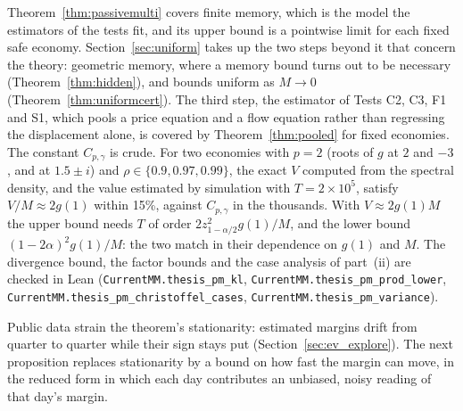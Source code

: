\begin{remark}\label{rem:passivecert}
Theorem~\ref{thm:passivemulti} covers finite memory, which is the model the estimators of the tests fit, and its upper bound is a pointwise limit for each fixed safe economy. Section~\ref{sec:uniform} takes up the two steps beyond it that concern the theory: geometric memory, where a memory bound turns out to be necessary (Theorem~\ref{thm:hidden}), and bounds uniform as $M\to0$ (Theorem~\ref{thm:uniformcert}). The third step, the estimator of Tests C2, C3, F1 and S1, which pools a price equation and a flow equation rather than regressing the displacement alone, is covered by Theorem~\ref{thm:pooled} for fixed economies. The constant $C_{p,\gamma}$ is crude. For two economies with $p=2$ (roots of $g$ at $2$ and $-3$, and at $1.5\pm i$) and $\rho\in\{0.9,0.97,0.99\}$, the exact $V$ computed from the spectral density, and the value estimated by simulation with $T=2\times10^5$, satisfy $V/M\approx2g(1)$ within 15\%, against $C_{p,\gamma}$ in the thousands. With $V\approx2g(1)M$ the upper bound needs $T$ of order $2z_{1-\alpha/2}^2g(1)/M$, and the lower bound $(1-2\alpha)^2g(1)/M$: the two match in their dependence on $g(1)$ and $M$. The divergence bound, the factor bounds and the case analysis of part~(ii) are checked in Lean (\nolinkurl{CurrentMM.thesis_pm_kl}, \nolinkurl{CurrentMM.thesis_pm_prod_lower}, \nolinkurl{CurrentMM.thesis_pm_christoffel_cases}, \nolinkurl{CurrentMM.thesis_pm_variance}).
\end{remark}

Public data strain the theorem's stationarity: estimated margins drift from quarter to quarter while their sign stays put (Section~\ref{sec:ev_explore}). The next proposition replaces stationarity by a bound on how fast the margin can move, in the reduced form in which each day contributes an unbiased, noisy reading of that day's margin.


